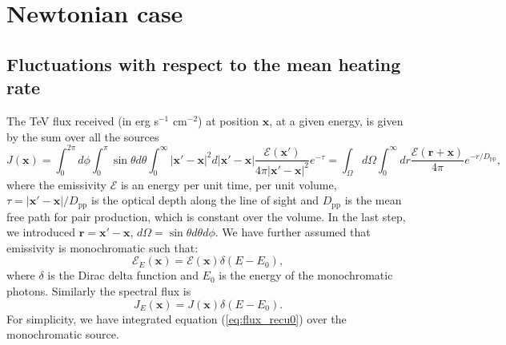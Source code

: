 \documentclass[numberedappendix]{emulateapj}
\begin{document}
\section {Newtonian case}\label{sec:windon_newt}
\subsection {Fluctuations with respect to the mean heating rate}

The TeV flux received (in erg s$^{-1}$ cm$^{-2}$) at position $\mathbf{x}$, at a given energy, is given by the sum over all the sources 
\begin{equation}
  \label{eq:flux_recu0}
  J(\mathbf{x})=
  \int_{0}^{2\pi}d\phi\int_{0}^{\pi}\sin\theta d\theta\int_0^{\infty}|\mathbf{x}'-\mathbf{x}|^2 d|\mathbf{x}'-\mathbf{x}|
  \frac{\mathcal{E}(\mathbf{x}') }{4\pi |\mathbf{x}'-\mathbf{x}|^2} e^{-\tau}
  =\int_{\Omega} d\Omega\int_0^{\infty} dr \frac{\mathcal{E}(\mathbf{r}+\mathbf{x}) }{4\pi } e^{- r/D_{\mathrm{pp}}},
\end{equation}
where the emissivity $\mathcal{E}$ is an energy per unit time, per unit volume, $\tau=|\mathbf{x}'-\mathbf{x}|/D_{\mathrm{pp}}$ is the optical depth along the line of sight and $D_{\mathrm{pp}}$ is the mean free path for pair production, which is constant over the volume. In the last step, we introduced $\mathbf{r}=\mathbf{x}'-\mathbf{x}$, $d\Omega=\sin\theta d\theta d\phi$. We have further assumed that emissivity is monochromatic such that:
\begin{equation}
\mathcal{E}_E(\mathbf{x}) = \mathcal{E}(\mathbf{x}) \delta(E-E_0),
\end{equation}
where $\delta$ is the Dirac delta function and $E_0$ is the energy of the monochromatic photons. Similarly the spectral flux is 
\begin{equation}
J_E(\mathbf{x}) = J(\mathbf{x}) \delta(E-E_0).
\end{equation}
For simplicity, we have integrated equation (\ref{eq:flux_recu0}) over the monochromatic source.
\end{document}

